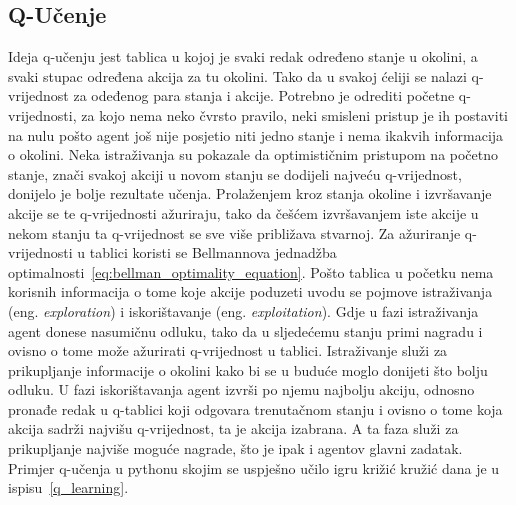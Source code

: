 \subsection{Q-Učenje}
Ideja q-učenju jest tablica u kojoj je svaki redak određeno stanje u okolini, a svaki stupac određena akcija za tu okolini. Tako da u svakoj ćeliji se nalazi q-vrijednost za odeđenog para stanja i akcije. Potrebno je odrediti početne q-vrijednosti, za kojo nema neko čvrsto pravilo, neki smisleni pristup je ih postaviti na nulu pošto agent još nije posjetio niti jedno stanje i nema ikakvih informacija o okolini. Neka istraživanja su pokazale da optimističnim pristupom na početno stanje, znači svakoj akciji u novom stanju se dodijeli najveću q-vrijednost, donijelo je bolje rezultate učenja. Prolaženjem kroz stanja okoline i izvršavanje akcije se te q-vrijednosti ažuriraju, tako da češćem izvršavanjem iste akcije u nekom stanju ta q-vrijednost se sve više približava stvarnoj. Za ažuriranje q-vrijednosti u tablici koristi se Bellmannova jednadžba optimalnosti~\ref{eq:bellman_optimality_equation}. Pošto tablica u početku nema korisnih informacija o tome koje akcije poduzeti uvodu se pojmove istraživanja (eng. \textit{exploration}) i iskorištavanje (eng. \textit{exploitation}). Gdje u fazi istraživanja agent donese nasumičnu odluku, tako da u sljedećemu stanju primi nagradu i ovisno o tome može ažurirati q-vrijednost u tablici. Istraživanje služi za prikupljanje informacije o okolini kako bi se u buduće moglo donijeti što bolju odluku. U fazi iskorištavanja agent izvrši po njemu najbolju akciju, odnosno pronađe redak u q-tablici koji odgovara trenutačnom stanju i ovisno o tome koja akcija sadrži najvišu q-vrijednost, ta je akcija izabrana. A ta faza služi za prikupljanje najviše moguće nagrade, što je ipak i agentov glavni zadatak. Primjer q-učenja u pythonu skojim se uspješno učilo igru križić kružić dana je u ispisu~\ref{q_learning}.
